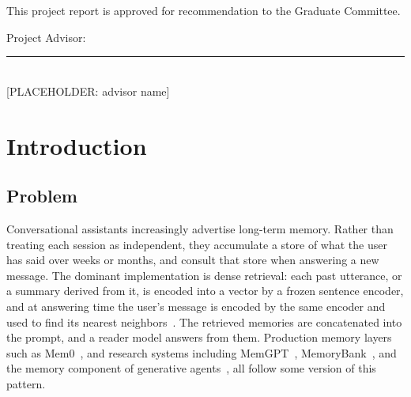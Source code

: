 \documentclass[12pt,letterpaper,oneside]{report}
\newcommand{\ph}[1]{\textcolor{phtext}{[\textsf{\footnotesize PLACEHOLDER: #1}]}}
\begin{document}
\clearpage

\thispagestyle{fancy}
\noindent This project report is approved for recommendation to the Graduate
Committee.

\vspace{0.6in}
\noindent Project Advisor:

\vspace{0.5in}
\noindent\rule{3.5in}{0.5pt}\\
\ph{advisor name}

\clearpage

\begin{singlespace}
\renewcommand{\contentsname}{\normalfont\bfseries\large TABLE OF CONTENTS}
\tableofcontents
\end{singlespace}
\clearpage

\begin{singlespace}
\renewcommand{\listfigurename}{\normalfont\bfseries\large LIST OF FIGURES}
\listoffigures
\end{singlespace}
\clearpage

\begin{singlespace}
\renewcommand{\listtablename}{\normalfont\bfseries\large LIST OF TABLES}
\listoftables
\end{singlespace}
\clearpage

\setcounter{page}{1}

\chapter{Introduction}
\label{ch:introduction}

\section{Problem}
\label{sec:problem}

Conversational assistants increasingly advertise long-term memory. Rather than
treating each session as independent, they accumulate a store of what the user
has said over weeks or months, and consult that store when answering a new
message. The dominant implementation is dense retrieval: each past utterance,
or a summary derived from it, is encoded into a vector by a frozen sentence
encoder, and at answering time the user's message is encoded by the same
encoder and used to find its nearest neighbors~\cite{sbert,dpr}. The retrieved
memories are concatenated into the prompt, and a reader model answers from
them. Production memory layers such as Mem0~\cite{mem0}, and research systems
including MemGPT~\cite{memgpt}, MemoryBank~\cite{memorybank}, and the memory
component of generative agents~\cite{genagents}, all follow some version of
this pattern.
\end{document}
